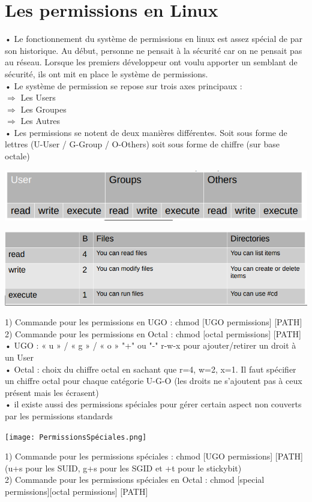 \documentclass[a4paper, 11pt, french, oneside]{book}
\begin{document}
		\section{Les permissions en Linux} 
			• Le fonctionnement du système de permissions en linux est assez spécial de par son historique. Au début, personne ne pensait à la sécurité car on ne pensait pas au réseau. Lorsque les premiers développeur ont voulu apporter un semblant de sécurité, ils ont mit en place le système de permissions.\\
		    • Le système de permission se repose sur trois axes principaux :\\
		 	$\Rightarrow$ Les Users\\
		 	$\Rightarrow$ Les Groupes\\
		 	$\Rightarrow$ Les Autres \\
			• Les permissions se notent de deux manières différentes. Soit sous forme de lettres (U-User / G-Group / O-Others) soit sous forme de chiffre (sur base octale)\\
			\begin{flushleft}
				\includegraphics[scale=0.6]{PermissionsLettres.png}
			\end{flushleft}
			\begin{flushleft}
				\includegraphics[scale=0.6]{PermissionsChiffres.png}
			\end{flushleft}
		 	1) Commande pour les permissions en UGO : chmod [UGO permissions] [PATH] \\
		 	2) Commande pour les permissions en Octal : chmod [octal permissions] [PATH] \\
			• UGO : « u » / « g » / « o » "+" ou "-" r-w-x pour ajouter/retirer un droit à un User \\
			• Octal : choix du chiffre octal en sachant que r=4, w=2, x=1. Il faut spécifier un chiffre octal pour chaque catégorie U-G-O (les droits ne s'ajoutent pas à ceux présent mais les écrasent) \\
			• il existe aussi des permissions spéciales pour gérer certain aspect non couverts par les permissions standards \\
			\begin{flushleft}
				\texttt{[image: PermissionsSpéciales.png]}
			\end{flushleft}
		 	1) Commande pour les permissions spéciales : chmod [UGO permissions] [PATH] (u+s pour les SUID, g+s pour les SGID et +t pour le stickybit) \\
			2) Commande pour les permissions spéciales en Octal : chmod [special permissions][octal permissions] [PATH] \\
\end{document}
